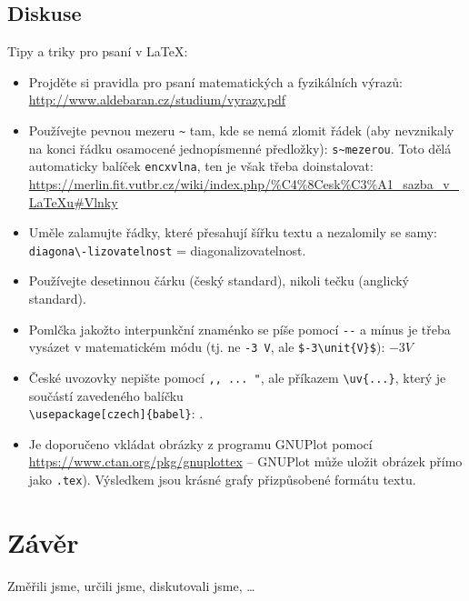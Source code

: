 			\newpage %
			
	\subsection{Diskuse}
	
			

		Tipy a triky pro psaní v \LaTeX:
			\begin{itemize}
			\item Projděte si pravidla pro psaní matematických a fyzikálních výrazů: 	\url{http://www.aldebaran.cz/studium/vyrazy.pdf}
			\item Používejte pevnou mezeru \verb|~| tam, kde se nemá zlomit řádek (aby nevznikaly na konci řádku osamocené jednopísmenné předložky): \verb|s~mezerou|. 
			Toto dělá automaticky balíček \verb|encxvlna|, ten je však třeba doinstalovat: \url{https://merlin.fit.vutbr.cz/wiki/index.php/%C4%8Cesk%C3%A1_sazba_v_LaTeXu#Vlnky}
			
			\item Uměle zalamujte řádky, které přesahují šířku textu a nezalomily se samy: \verb|diagona\-lizovatelnost| = diagona\-lizovatelnost.

			\item Používejte desetinnou čárku (český standard), nikoli tečku (anglický standard).
			
			\item Pomlčka jakožto interpunkční znaménko se píše pomocí \verb|--| a mínus je třeba vysázet v matematickém módu (tj. ne \verb|-3 V|, ale \verb|$-3\unit{V}$|): $-3\unit{V}$ 
			
			\item České uvozovky nepište pomocí \verb|,, ... "|, ale příkazem \verb|\uv{...}|, který je součástí zavedeného balíčku \\ \verb|\usepackage[czech]{babel}|: .
			
			\item Je doporučeno vkládat obrázky z programu GNUPlot pomocí \url{https://www.ctan.org/pkg/gnuplottex} -- GNUPlot může uložit obrázek přímo jako \texttt{.tex}). Výsledkem jsou krásné grafy přizpůsobené formátu textu.
				\end{itemize}

			
\section{Závěr}
		Změřili jsme, určili jsme, diskutovali jsme, \dots
	



